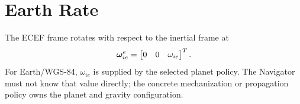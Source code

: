 \section{Earth Rate}

The ECEF frame rotates with respect to the inertial frame at
\begin{equation}
\boldsymbol{\omega}_{ie}^{e}
=
\begin{bmatrix}
0 & 0 & \omega_{ie}
\end{bmatrix}^{T}.
\end{equation}
For Earth/WGS-84, $\omega_{ie}$ is supplied by the selected planet policy. The
Navigator must not know that value directly; the concrete mechanization or
propagation policy owns the planet and gravity configuration.
